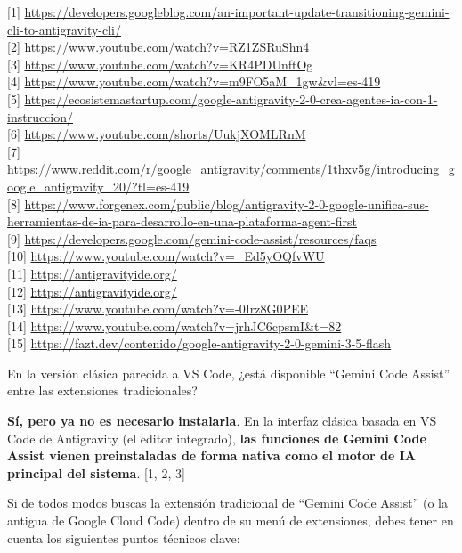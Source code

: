 \documentclass[12pt, a4paper]{article}
\begin{document}
[1] \url{https://developers.googleblog.com/an-important-update-transitioning-gemini-cli-to-antigravity-cli/} \\{}
[2] \url{https://www.youtube.com/watch?v=RZ1ZSRuShn4} \\{}
[3] \url{https://www.youtube.com/watch?v=KR4PDUnftOg} \\{}
[4] \url{https://www.youtube.com/watch?v=m9FO5aM_1gw&vl=es-419} \\{}
[5] \url{https://ecosistemastartup.com/google-antigravity-2-0-crea-agentes-ia-con-1-instruccion/} \\{}
[6] \url{https://www.youtube.com/shorts/UukjXOMLRnM} \\{}
[7] \url{https://www.reddit.com/r/google_antigravity/comments/1thxv5g/introducing_google_antigravity_20/?tl=es-419} \\{}
[8] \url{https://www.forgenex.com/public/blog/antigravity-2-0-google-unifica-sus-herramientas-de-ia-para-desarrollo-en-una-plataforma-agent-first} \\{}
[9] \url{https://developers.google.com/gemini-code-assist/resources/faqs} \\{}
[10] \url{https://www.youtube.com/watch?v=_Ed5yOQfvWU} \\{}
[11] \url{https://antigravityide.org/} \\{}
[12] \url{https://antigravityide.org/} \\{}
[13] \url{https://www.youtube.com/watch?v=-0Irz8G0PEE} \\{}
[14] \url{https://www.youtube.com/watch?v=jrhJC6cpsmI&t=82} \\{}
[15] \url{https://fazt.dev/contenido/google-antigravity-2-0-gemini-3-5-flash}

En la versión clásica parecida a VS Code, ¿está disponible ``Gemini Code Assist'' entre las extensiones tradicionales?

\textbf{Sí, pero ya no es necesario instalarla}. En la interfaz clásica basada en VS Code de Antigravity (el editor integrado), \textbf{las funciones de Gemini Code Assist vienen preinstaladas de forma nativa como el motor de IA principal del sistema}. [1, 2, 3]

Si de todos modos buscas la extensión tradicional de ``Gemini Code Assist'' (o la antigua de Google Cloud Code) dentro de su menú de extensiones, debes tener en cuenta los siguientes puntos técnicos clave:
\end{document}

